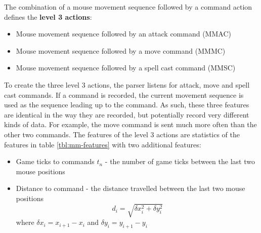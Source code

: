 \documentclass[Report.tex]{subfiles}
\begin{document}
The combination of a mouse movement sequence followed by a command action defines the \textbf{level 3 actions}:
\begin{itemize}
\item Mouse movement sequence followed by an attack command (MMAC)
\item Mouse movement sequence followed by a move command (MMMC)
\item Mouse movement sequence followed by a spell cast command (MMSC)
\end{itemize}
To create the three level 3 actions, the parser listens for attack, move and spell cast commands. If a command is recorded, the current movement sequence is used as the sequence leading up to the command. As such, these three features are identical in the way they are recorded, but potentially record very different kinds of data. For example, the move command is sent much more often than the other two commands. The features of the level 3 actions are statistics of the features in table \ref{tbl:mm-features} with two additional features:
\begin{itemize}
\item Game ticks to commands $t_n$ - the number of game ticks between the last two mouse positions
\item Distance to command - the distance travelled between the last two mouse positions
\begin{equation}
d_i = \sqrt{\delta x_{i}^2 + \delta y_{i}^2}
\end{equation} 
where $\delta x_i = x_{i+1} - x_i$ and $\delta y_i = y_{i+1} - y_i$
\end{itemize}
\end{document}
